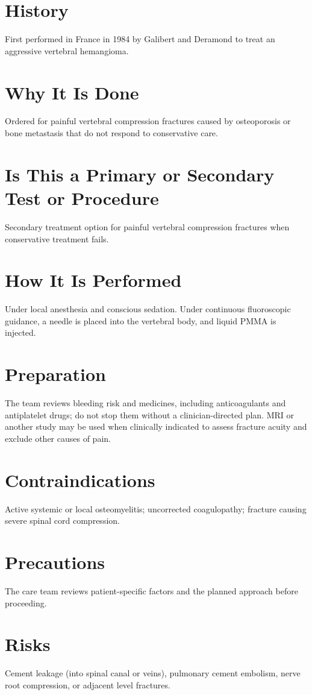 \section*{History}
First performed in France in 1984 by Galibert and Deramond to treat an aggressive vertebral hemangioma.

\section*{Why It Is Done}
Ordered for painful vertebral compression fractures caused by osteoporosis or bone metastasis that do not respond to conservative care.

\section*{Is This a Primary or Secondary Test or Procedure}
Secondary treatment option for painful vertebral compression fractures when conservative treatment fails.

\section*{How It Is Performed}
Under local anesthesia and conscious sedation. Under continuous fluoroscopic guidance, a needle is placed into the vertebral body, and liquid PMMA is injected.

\section*{Preparation}
The team reviews bleeding risk and medicines, including anticoagulants and antiplatelet drugs; do not stop them without a clinician-directed plan. MRI or another study may be used when clinically indicated to assess fracture acuity and exclude other causes of pain.

\section*{Contraindications}
Active systemic or local osteomyelitis; uncorrected coagulopathy; fracture causing severe spinal cord compression.

\section*{Precautions}
The care team reviews patient-specific factors and the planned approach before proceeding.

\section*{Risks}
Cement leakage (into spinal canal or veins), pulmonary cement embolism, nerve root compression, or adjacent level fractures.

